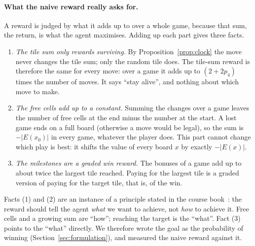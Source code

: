 \documentclass[11pt,a4paper]{article}
\theoremstyle{remark}
\begin{document}
\paragraph{What the naive reward really asks for.} A reward is judged by what it adds up to over a whole game, because that sum, the return, is what the agent maximises. Adding up each part gives three facts.
\begin{enumerate}[label=(\arabic*), leftmargin=*]
\item \emph{The tile sum only rewards surviving.} By Proposition~\ref{prop:clock} the move never changes the tile sum; only the random tile does. The tile-sum reward is therefore the same for every move: over a game it adds up to $(2+2p_4)$ times the number of moves. It says ``stay alive'', and nothing about which move to make.
\item \emph{The free cells add up to a constant.} Summing the changes over a game leaves the number of free cells at the end minus the number at the start. A lost game ends on a full board (otherwise a move would be legal), so the sum is $-|E(x_0)|$ in every game, whatever the player does. This part cannot change which play is best: it shifts the value of every board $x$ by exactly $-|E(x)|$.
\item \emph{The milestones are a graded win reward.} The bonuses of a game add up to about twice the largest tile reached. Paying for the largest tile is a graded version of paying for the target tile, that is, of the win.
\end{enumerate}
Facts (1) and (2) are an instance of a principle stated in the course book~\cite[\S3.2]{sutton2018}: the reward should tell the agent \emph{what} we want to achieve, not \emph{how} to achieve it. Free cells and a growing sum are ``how''; reaching the target is the ``what''. Fact (3) points to the ``what'' directly. We therefore wrote the goal as the probability of winning (Section~\ref{sec:formulation}), and measured the naive reward against it.
\end{document}
